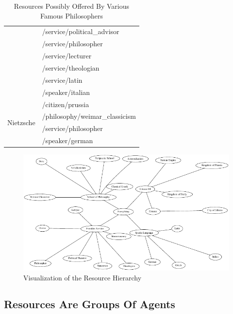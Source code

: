 \begin{table}
\begin{center}
\begin{tabular}{| c | l |}
			                                         & /service/political\_advisor \\
			                                         & /service/philosopher \\
			                                         & /service/lecturer \\
			                                         & /service/theologian \\
			                                         & /service/latin \\
			                                         & /speaker/italian \\
			\hline
			  \multirow{4}{*}{Nietzsche}             & /citizen/prussia \\
			                                         & /philosophy/weimar\_classicism \\
			                                         & /service/philosopher \\
			                                         & /speaker/german \\
			\hline
		\end{tabular}
	\end{center}
	\caption{Resources Possibly Offered By Various Famous Philosophers}
	\label{tbl:res-philosopher}
\end{table}

\begin{figure}
	\begin{center}\includegraphics[width=\myfigwidth,height=\myfigheight,keepaspectratio]{figs/dot/res_example2}\end{center}
	\caption{Visualization of the Resource Hierarchy}\label{fig:res-example2}
\end{figure}

\subsection{Resources Are Groups Of Agents}

